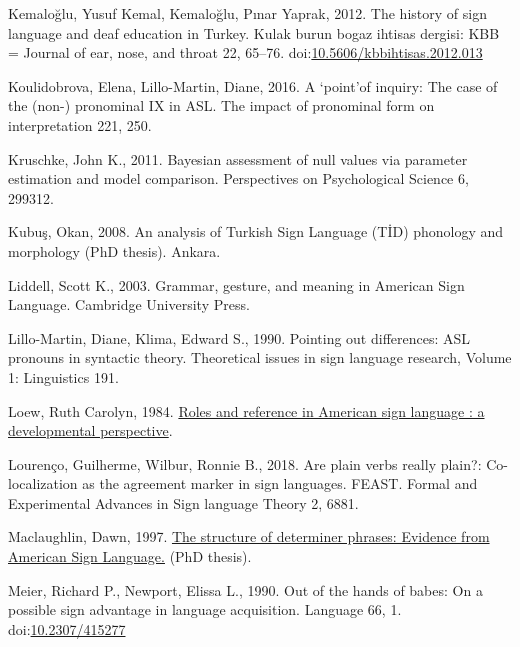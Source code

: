 \documentclass[]{elsarticle} %
\newlength{\cslhangindent}
\newenvironment{CSLReferences}[2] %
 {%
  \setlength{\parindent}{0pt}
  \ifodd #1 \everypar{\setlength{\hangindent}{\cslhangindent}}\ignorespaces\fi
  \ifnum #2 > 0
  \setlength{\parskip}{#2\baselineskip}
  \fi
 }%
 {}
\begin{document}
\begin{CSLReferences}{1}{0}
\leavevmode{}%
Kemaloğlu, Yusuf Kemal, Kemaloğlu, Pınar Yaprak, 2012. The history of
sign language and deaf education in Turkey. Kulak burun bogaz ihtisas
dergisi: KBB = Journal of ear, nose, and throat 22, 65--76.
doi:\href{https://doi.org/10.5606/kbbihtisas.2012.013}{10.5606/kbbihtisas.2012.013}

\leavevmode{}%
Koulidobrova, Elena, Lillo-Martin, Diane, 2016. A {`}point{'}of inquiry:
The case of the (non-) pronominal IX in ASL. The impact of pronominal
form on interpretation 221, 250.

\leavevmode{}%
Kruschke, John K., 2011. Bayesian assessment of null values via
parameter estimation and model comparison. Perspectives on Psychological
Science 6, 299312.

\leavevmode{}%
Kubuş, Okan, 2008. An analysis of Turkish Sign Language (T{İ}D)
phonology and morphology (PhD thesis). Ankara.

\leavevmode{}%
Liddell, Scott K., 2003. Grammar, gesture, and meaning in American Sign
Language. Cambridge University Press.

\leavevmode{}%
Lillo-Martin, Diane, Klima, Edward S., 1990. Pointing out differences:
ASL pronouns in syntactic theory. Theoretical issues in sign language
research, Volume 1: Linguistics 191.

\leavevmode{}%
Loew, Ruth Carolyn, 1984.
\href{https:///paper/Roles-and-reference-in-American-sign-language-\%3A-a-Loew/315c2c539d3bd88fbc13564775141ba4a60ac5aa}{Roles
and reference in American sign language : a developmental perspective}.

\leavevmode{}%
Lourenço, Guilherme, Wilbur, Ronnie B., 2018. Are plain verbs really
plain?: Co-localization as the agreement marker in sign languages.
FEAST. Formal and Experimental Advances in Sign language Theory 2, 6881.

\leavevmode{}%
Maclaughlin, Dawn, 1997.
\href{http://lear.unive.it/jspui/handle/11707/7016}{The structure of
determiner phrases: Evidence from American Sign Language.} (PhD thesis).

\leavevmode{}%
Meier, Richard P., Newport, Elissa L., 1990. Out of the hands of babes:
On a possible sign advantage in language acquisition. Language 66, 1.
doi:\href{https://doi.org/10.2307/415277}{10.2307/415277}


\end{CSLReferences}
\end{document}
